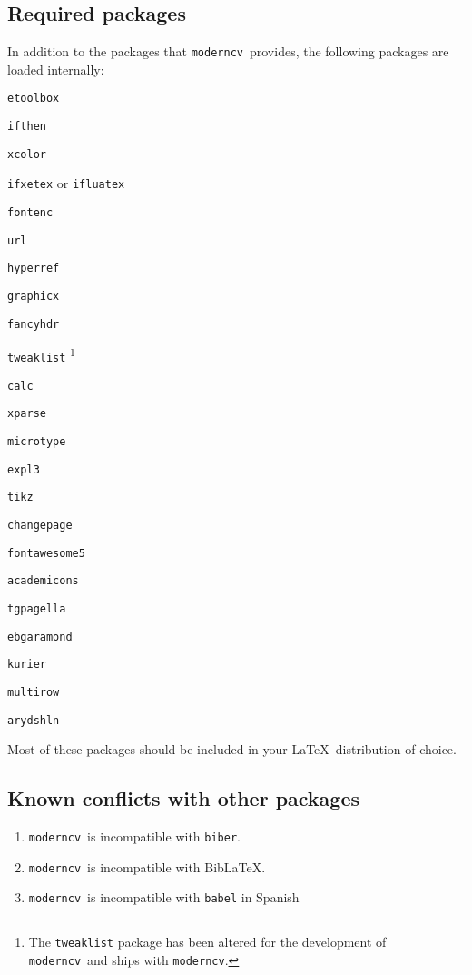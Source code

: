\documentclass[a4paper, 11pt]{article}
\newcommand{\code}[1]{\lstinline!#1!}
\newcommand{\moderncv}{\code{moderncv}}
\newcommand{\Moderncv}{\moderncv~}
\newcommand{\Latex}{\LaTeX~}
\newcommand{\biblatex}{BibLaTeX}
\begin{document}
\subsection{Required packages}
\label{section:implementationDetails:requiredPackages}
In addition to the packages that \Moderncv provides, the following packages are loaded internally:
\begin{itemize}
  \begin{multicols}{3}
    \item \code{etoolbox}
    \item \code{ifthen}
    \item \code{xcolor}
    \item \code{ifxetex} or \code{ifluatex}
    \item \code{fontenc}
    \item \code{url}
    \item \code{hyperref}
    \item \code{graphicx}
    \item \code{fancyhdr}
    \item \code{tweaklist}%
    \footnote{The \code{tweaklist} package has been altered for the development of \Moderncv and ships with \moderncv.}
    \item \code{calc}
    \item \code{xparse}
    \item \code{microtype}
    \item \code{expl3}
    \item \code{tikz}
    \item \code{changepage}
    \item \code{fontawesome5}
    \item \code{academicons}
    \item \code{tgpagella}
    \item \code{ebgaramond}
    \item \code{kurier}
    \item \code{multirow}
    \item \code{arydshln}
  \end{multicols}
\end{itemize}

Most of these packages should be included in your \Latex distribution of choice.

\subsection{Known conflicts with other packages}
\begin{enumerate}
  \item \Moderncv is incompatible with \code{biber}.
  \item \Moderncv is incompatible with \biblatex.
  \item \Moderncv is incompatible with \code{babel} in Spanish
\end{enumerate}
\end{document}
